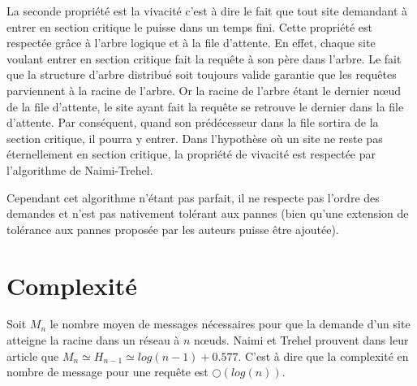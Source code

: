 La seconde propriété est la vivacité c'est à dire le fait que tout site demandant à entrer en section critique le puisse dans un temps fini. Cette propriété est respectée grâce à l'arbre logique et à la file d'attente. En effet, chaque site voulant entrer en section critique fait la requête à son père dans l'arbre. Le fait que la structure d'arbre distribué soit toujours valide garantie que les requêtes parviennent à la racine de l'arbre. Or la racine de l'arbre étant le dernier nœud de la file d'attente, le site ayant fait la requête se retrouve le dernier dans la file d'attente. Par conséquent, quand son prédécesseur dans la file sortira de la section critique, il pourra y entrer. Dans l'hypothèse où un site ne reste pas éternellement en section critique, la propriété de vivacité est respectée par l'algorithme de Naimi-Trehel.

Cependant cet algorithme n'étant pas parfait, il ne respecte pas l'ordre des demandes et n'est pas nativement tolérant aux pannes (bien qu'une extension de tolérance aux pannes \cite{naimi1988} proposée par les auteurs puisse être ajoutée).


\section{Complexité}
Soit $M_n$ le nombre moyen de messages nécessaires pour que la demande d'un site atteigne la racine dans un réseau à $n$ nœuds. Naimi et Trehel prouvent dans leur article \cite{naimi1996} que $M_n \simeq H_{n-1} \simeq log(n-1) + 0.577$. C'est à dire que la complexité en nombre de message pour une requête est $\bigcirc(log(n))$.


